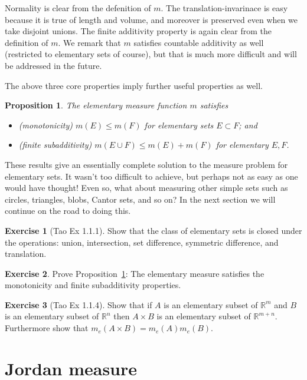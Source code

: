 \documentclass[11pt,oneside]{amsbook}
\newcommand{\RR}{{\mathbb R}}
\theoremstyle{definition}
\newtheorem{exerc}{Exercise}[section]
\theoremstyle{plain}
\newtheorem{prop}[thm]{Proposition}
\theoremstyle{definition}
\theoremstyle{remark}
\numberwithin{equation}{section}
\numberwithin{figure}{section}
\begin{document}
Normality is clear from the defenition of $m$. The translation-invarinace is easy because it is true of length and volume, and moreover is preserved even when we take disjoint unions. The finite additivity property is again clear from the definition of $m$. We remark that $m$ satisfies countable additivity as well (restricted to elementary sets of course), but that is much more difficult and will be addressed in the future.

The above three core properties imply further useful properties as well.

\begin{prop}
  \label{prop:elementary-further}
  The elementary measure function $m$ satisfies
  \begin{itemize}
  \item (monotonicity) $m(E)\leq m(F)$ for elementary sets $E\subset F$; and
  \item (finite subadditivity) $m(E\cup F)\leq m(E)+m(F)$ for elementary $E,F$.
  \end{itemize}
\end{prop}

These results give an essentially complete solution to the measure problem for elementary sets. It wasn't too difficult to achieve, but perhaps not as easy as one would have thought! Even so, what about measuring other simple sets such as circles, triangles, blobs, Cantor sets, and so on? In the next section we will continue on the road to doing this.

\begin{exerc}[Tao Ex 1.1.1]
  Show that the class of elementary sets is closed under the operations: union, intersection, set difference, symmetric difference, and translation.
\end{exerc}

\begin{exerc}
  Prove Proposition~\ref{prop:elementary-further}: The elementary measure satisfies the monotonicity and finite subadditivity properties.
\end{exerc}

\begin{exerc}[Tao Ex 1.1.4]
  Show that if $A$ is an elementary subset of $\RR^m$ and $B$ is an elementary subset of $\RR^n$ then $A\times B$ is an elementary subset of $\RR^{m+n}$. Furthermore show that $m_e(A\times B)=m_e(A)m_e(B)$.
\end{exerc}

\newpage
\section{Jordan measure}
\end{document}
